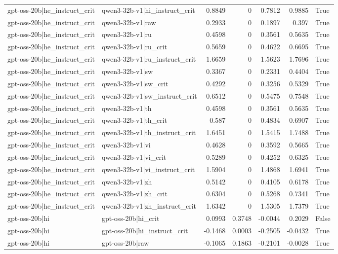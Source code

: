 \begin{table}
\begin{tabular}{l l r r r r l}
gpt-oss-20b|he_instruct_crit & qwen3-32b-v1|hi_instruct_crit & 0.8849 & 0 & 0.7812 & 0.9885 & True \\
gpt-oss-20b|he_instruct_crit & qwen3-32b-v1|raw & 0.2933 & 0 & 0.1897 & 0.397 & True \\
gpt-oss-20b|he_instruct_crit & qwen3-32b-v1|ru & 0.4598 & 0 & 0.3561 & 0.5635 & True \\
gpt-oss-20b|he_instruct_crit & qwen3-32b-v1|ru_crit & 0.5659 & 0 & 0.4622 & 0.6695 & True \\
gpt-oss-20b|he_instruct_crit & qwen3-32b-v1|ru_instruct_crit & 1.6659 & 0 & 1.5623 & 1.7696 & True \\
gpt-oss-20b|he_instruct_crit & qwen3-32b-v1|sw & 0.3367 & 0 & 0.2331 & 0.4404 & True \\
gpt-oss-20b|he_instruct_crit & qwen3-32b-v1|sw_crit & 0.4292 & 0 & 0.3256 & 0.5329 & True \\
gpt-oss-20b|he_instruct_crit & qwen3-32b-v1|sw_instruct_crit & 0.6512 & 0 & 0.5475 & 0.7548 & True \\
gpt-oss-20b|he_instruct_crit & qwen3-32b-v1|th & 0.4598 & 0 & 0.3561 & 0.5635 & True \\
gpt-oss-20b|he_instruct_crit & qwen3-32b-v1|th_crit & 0.587 & 0 & 0.4834 & 0.6907 & True \\
gpt-oss-20b|he_instruct_crit & qwen3-32b-v1|th_instruct_crit & 1.6451 & 0 & 1.5415 & 1.7488 & True \\
gpt-oss-20b|he_instruct_crit & qwen3-32b-v1|vi & 0.4628 & 0 & 0.3592 & 0.5665 & True \\
gpt-oss-20b|he_instruct_crit & qwen3-32b-v1|vi_crit & 0.5289 & 0 & 0.4252 & 0.6325 & True \\
gpt-oss-20b|he_instruct_crit & qwen3-32b-v1|vi_instruct_crit & 1.5904 & 0 & 1.4868 & 1.6941 & True \\
gpt-oss-20b|he_instruct_crit & qwen3-32b-v1|zh & 0.5142 & 0 & 0.4105 & 0.6178 & True \\
gpt-oss-20b|he_instruct_crit & qwen3-32b-v1|zh_crit & 0.6304 & 0 & 0.5268 & 0.7341 & True \\
gpt-oss-20b|he_instruct_crit & qwen3-32b-v1|zh_instruct_crit & 1.6342 & 0 & 1.5305 & 1.7379 & True \\
gpt-oss-20b|hi & gpt-oss-20b|hi_crit & 0.0993 & 0.3748 & -0.0044 & 0.2029 & False \\
gpt-oss-20b|hi & gpt-oss-20b|hi_instruct_crit & -0.1468 & 0.0003 & -0.2505 & -0.0432 & True \\
gpt-oss-20b|hi & gpt-oss-20b|raw & -0.1065 & 0.1863 & -0.2101 & -0.0028 & True \\

\end{tabular}
\end{table}
